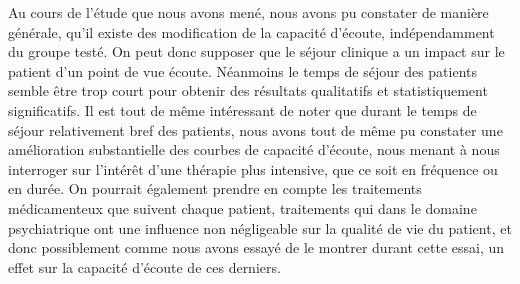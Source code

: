 \begin{itemize}
 Au cours de l'étude que nous avons mené, nous avons pu constater de manière générale, 
 qu'il existe des modification de la capacité d'écoute, indépendamment du groupe testé. On peut donc 
 supposer que le séjour clinique a un impact sur le patient d'un point de vue écoute.
 \newline 
 Néanmoins le temps de séjour des patients semble être trop court pour obtenir des résultats qualitatifs 
 et statistiquement significatifs. Il est tout de même intéressant de noter que durant le temps de séjour 
 relativement bref des patients, nous avons tout de même pu constater une amélioration substantielle 
 des courbes de capacité d'écoute, nous menant à nous interroger sur l'intérêt d'une thérapie plus 
 intensive, que ce soit en fréquence ou en durée. On pourrait également prendre en compte les 
 traitements médicamenteux que suivent chaque patient, traitements qui dans le domaine psychiatrique 
 ont une influence non négligeable sur la qualité de vie du patient, et donc possiblement comme nous 
 avons essayé de le montrer durant cette essai, un effet sur la capacité d'écoute de ces derniers.
 
  \end{itemize}

  
  
